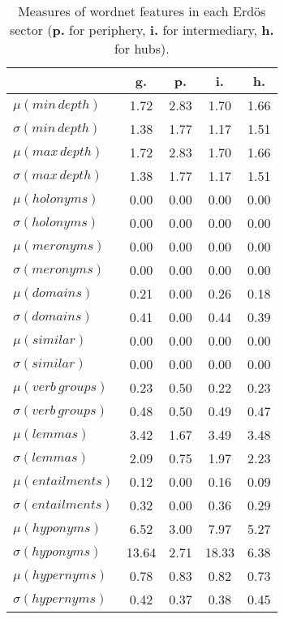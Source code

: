 \begin{table}[h!]
\begin{center}
\begin{tabular}{| l || c | c | c | c |}\hline
 & {\bf g.} & {\bf p.} & {\bf i.} & {\bf h.} \\\hline\hline
$\mu(min\,depth)$ & 1.72  & 2.83  & 1.70  & 1.66 \\
$\sigma(min\,depth)$ & 1.38  & 1.77  & 1.17  & 1.51 \\\hline
$\mu(max\,depth)$ & 1.72  & 2.83  & 1.70  & 1.66 \\
$\sigma(max\,depth)$ & 1.38  & 1.77  & 1.17  & 1.51 \\\hline
$\mu(holonyms)$ & 0.00  & 0.00  & 0.00  & 0.00 \\
$\sigma(holonyms)$ & 0.00  & 0.00  & 0.00  & 0.00 \\\hline
$\mu(meronyms)$ & 0.00  & 0.00  & 0.00  & 0.00 \\
$\sigma(meronyms)$ & 0.00  & 0.00  & 0.00  & 0.00 \\\hline
$\mu(domains)$ & 0.21  & 0.00  & 0.26  & 0.18 \\
$\sigma(domains)$ & 0.41  & 0.00  & 0.44  & 0.39 \\\hline
$\mu(similar)$ & 0.00  & 0.00  & 0.00  & 0.00 \\
$\sigma(similar)$ & 0.00  & 0.00  & 0.00  & 0.00 \\\hline
$\mu(verb\,groups)$ & 0.23  & 0.50  & 0.22  & 0.23 \\
$\sigma(verb\,groups)$ & 0.48  & 0.50  & 0.49  & 0.47 \\\hline
$\mu(lemmas)$ & 3.42  & 1.67  & 3.49  & 3.48 \\
$\sigma(lemmas)$ & 2.09  & 0.75  & 1.97  & 2.23 \\\hline
$\mu(entailments)$ & 0.12  & 0.00  & 0.16  & 0.09 \\
$\sigma(entailments)$ & 0.32  & 0.00  & 0.36  & 0.29 \\\hline
$\mu(hyponyms)$ & 6.52  & 3.00  & 7.97  & 5.27 \\
$\sigma(hyponyms)$ & 13.64  & 2.71  & 18.33  & 6.38 \\\hline
$\mu(hypernyms)$ & 0.78  & 0.83  & 0.82  & 0.73 \\
$\sigma(hypernyms)$ & 0.42  & 0.37  & 0.38  & 0.45 \\\hline
\end{tabular}
\caption{Measures of wordnet features in each Erd\"os sector ({{\bf p.}} for periphery, {{\bf i.}} for intermediary, {{\bf h.}} for hubs).}
\end{center}
\end{table}
